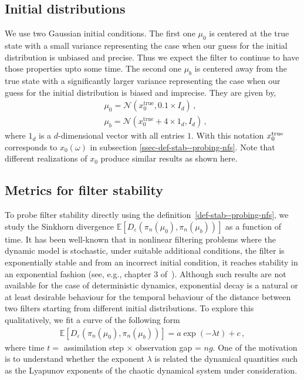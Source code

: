 \subsection{Initial distributions}\label{ssec-init-dist--probing-nfs}
We use two Gaussian initial conditions. The first one $\mu_0$ is centered at the true state with a small variance representing the case when our guess for the initial distribution is unbiased and precise. Thus we expect the filter to continue to have those properties {\color{mypink} upto some time.} The second one $\mu_b$ is centered away from the true state with a significantly larger variance representing the case when our guess for the initial distribution is biased and imprecise. They are given by,
\begin{align}
    &\mu_0 = \mathcal{N}(x_0^{\text{true}}, 0.1\times I_d) \,, \nonumber \\
    &\mu_b = \mathcal{N}(x_0^{\text{true}} + 4\times1_d, I_d) \,,
\label{eq-3ic--probing-nfs} \end{align}
where $1_d$ is a $d$-dimensional vector with all entries $1$. {\color{mypink}With this notation $x_0^{\rm true}$ corresponds to $x_0(\omega)$ in subsection \ref{ssec-def-stab--probing-nfs}. Note that different realizations of $x_0$ produce similar results as shown here.}


\subsection{Metrics for filter stability}

To probe filter stability directly using the definition~\ref{def-stab--probing-nfs}, we study the Sinkhorn divergence $\mathbb E[D_\varepsilon(\pi_n(\mu_0), \pi_n(\mu_b))]$ as a function of time. It has been well-known that in nonlinear filtering problems where the dynamic model is stochastic, under suitable additional conditions, the filter is exponentially stable and from an incorrect initial condition, it reaches stability in an exponential fashion (see, e.g., chapter 3 of~\cite{van2008hidden}). Although such results are not available for the case of deterministic dynamics, exponential decay is a natural or at least desirable behaviour for the temporal behaviour of the distance between two filters starting from different initial distributions. To explore this qualitatively, we fit a curve of the following form
\begin{align}
    \mathbb E[D_\varepsilon(\pi_n(\mu_0), \pi_n(\mu_b))] = a\exp(-\lambda t) + c \,, \label{eq:fit--probing-nfs}
\end{align}
where time $t=$ assimilation step $\times$ observation gap = $ng$. One of the motivation is to understand whether the exponent $\lambda$ is related the dynamical quantities such as the Lyapunov exponents of the chaotic dynamical system under consideration.

